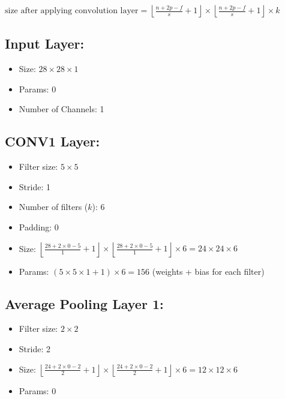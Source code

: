 \documentclass{article}
\begin{document}
\begin{latin}
\begin{figure}[H]
	\caption{}
	\label{fig:traditional-convolutional-network}
\end{figure}

$
\text{size after applying convolution layer} = \left\lfloor \frac{n + 2p - f}{s} + 1 \right\rfloor \times \left\lfloor \frac{n + 2p - f}{s} + 1 \right\rfloor \times k
$

\subsection*{Input Layer:}
\begin{itemize}
    \item Size: $28 \times 28 \times 1$
    \item Params: $0$
    \item Number of Channels: 1
\end{itemize}

\subsection*{CONV1 Layer:}
\begin{itemize}
    \item Filter size: $5 \times 5$
    \item Stride: 1
    \item Number of filters ($k$): 6
    \item Padding: 0
    \item Size: $\left\lfloor \frac{28 + 2 \times 0 - 5}{1} + 1 \right\rfloor \times \left\lfloor \frac{28 + 2 \times 0 - 5}{1} + 1 \right\rfloor \times 6 = 24 \times 24 \times 6$
    \item Params: $(5 \times 5 \times 1 + 1) \times 6 = 156$ (weights + bias for each filter)
\end{itemize}

\subsection*{Average Pooling Layer 1:}
\begin{itemize}
    \item Filter size: $2 \times 2$
    \item Stride: 2
    \item Size: $\left\lfloor \frac{24 + 2 \times 0 - 2}{2} + 1 \right\rfloor \times \left\lfloor \frac{24 + 2 \times 0 - 2}{2} + 1 \right\rfloor \times 6 = 12 \times 12 \times 6$
    \item Params: $0$
\end{itemize}


\end{latin}
\end{document}
